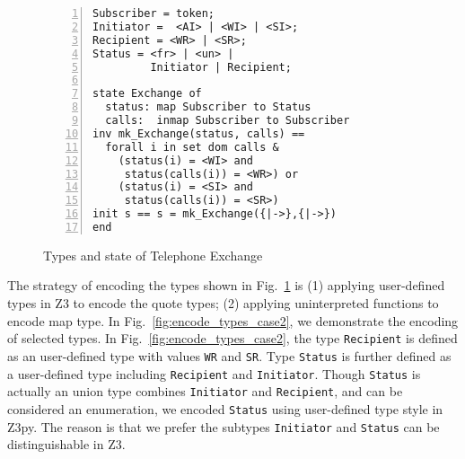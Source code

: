 \begin{figure}[t]
\begin{center}
\begin{mdframed}[roundcorner=5pt]
\begin{Verbatim}[fontsize=\small,numbers=left]
Subscriber = token;
Initiator =  <AI> | <WI> | <SI>;
Recipient = <WR> | <SR>;
Status = <fr> | <un> |
         Initiator | Recipient;
                                                                      
state Exchange of
  status: map Subscriber to Status
  calls:  inmap Subscriber to Subscriber
inv mk_Exchange(status, calls) == 
  forall i in set dom calls & 
    (status(i) = <WI> and
     status(calls(i)) = <WR>) or
    (status(i) = <SI> and
     status(calls(i)) = <SR>)
init s == s = mk_Exchange({|->},{|->})
end
\end{Verbatim}
\end{mdframed}
\vspace{-10pt}
\caption{Types and state of Telephone Exchange}
\label{fig:types_case2}
\end{center}
\vspace{-20pt}
\end{figure}

The strategy of encoding the types shown in Fig.~\ref{fig:types_case2} is (1) applying user-defined types in Z3 to encode the quote types; (2) applying uninterpreted functions to encode map type. In Fig.~\ref{fig:encode_types_case2}, we demonstrate the encoding of selected types. In Fig.~\ref{fig:encode_types_case2}, the type {\tt Recipient} is defined as an user-defined type with values {\tt WR} and {\tt SR}. Type {\tt Status} is further defined as a user-defined type including {\tt Recipient} and {\tt Initiator}. Though {\tt Status} is actually an union type combines {\tt Initiator} and {\tt Recipient}, and can be considered an enumeration, we encoded {\tt Status} using user-defined type style in Z3py. The reason is that we prefer the subtypes {\tt Initiator} and {\tt Status} can be distinguishable in Z3.

